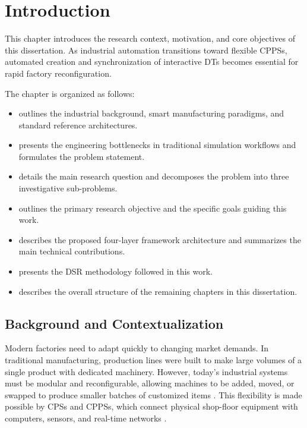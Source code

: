 
%

\chapter{Introduction}
\label{cha:introduction}

This chapter introduces the research context, motivation, and core objectives of this dissertation. As industrial automation transitions toward flexible \glspl{CPPS}, automated creation and synchronization of interactive \glspl{DT} becomes essential for rapid factory reconfiguration.

The chapter is organized as follows:
\begin{itemize}
    \item {} outlines the industrial background, smart manufacturing paradigms, and standard reference architectures.
    \item {} presents the engineering bottlenecks in traditional simulation workflows and formulates the problem statement.
    \item {} details the main research question and decomposes the problem into three investigative sub-problems.
    \item {} outlines the primary research objective and the specific goals guiding this work.
    \item {} describes the proposed four-layer framework architecture and summarizes the main technical contributions.
    \item {} presents the \gls{DSR} methodology followed in this work.
    \item {} describes the overall structure of the remaining chapters in this dissertation.
\end{itemize}

\section{Background and Contextualization}
\label{sec:background}

Modern factories need to adapt quickly to changing market demands. In traditional manufacturing, production lines were built to make large volumes of a single product with dedicated machinery. However, today's industrial systems must be modular and reconfigurable, allowing machines to be added, moved, or swapped to produce smaller batches of customized items \cite{Khan2025}. This flexibility is made possible by \glspl{CPS} and \glspl{CPPS}, which connect physical shop-floor equipment with computers, sensors, and real-time networks \cite{Abdel-Aty2022,Rocha2024}.

